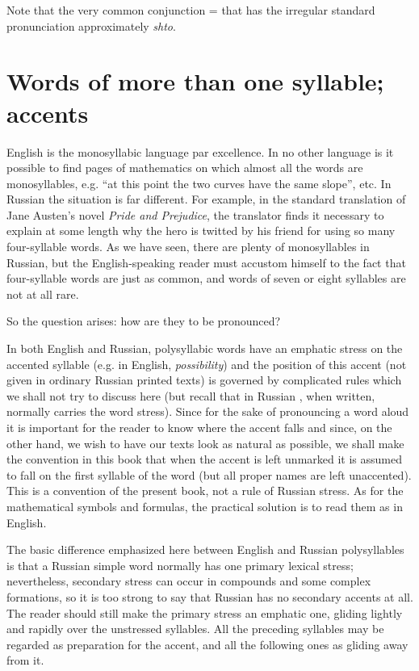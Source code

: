 Note that the very common conjunction  = that has the irregular standard pronunciation approximately \emph{shto}.

\section{Words of more than one syllable; accents}

English is the monosyllabic language par excellence. In no other language is it possible to find pages of mathematics on which almost all the words are monosyllables, e.g. ``at this point the two curves have the same slope'', etc. In Russian the situation is far different. For example, in the standard translation of Jane Austen's novel \emph{Pride and Prejudice}, the translator finds it necessary to explain at some length why the hero is twitted by his friend for using so many four-syllable words. As we have seen, there are plenty of monosyllables in Russian, but the English-speaking reader must accustom himself to the fact that four-syllable words are just as common, and words of seven or eight syllables are not at all rare.

So the question arises: how are they to be pronounced?

In both English and Russian, polysyllabic words have an emphatic stress on the accented syllable (e.g. in English, \emph{possibility}) and the position of this accent (not given in ordinary Russian printed texts) is governed by complicated rules which we shall not try to discuss here (but recall that in Russian , when written, normally carries the word stress). Since for the sake of pronouncing a word aloud it is important for the reader to know where the accent falls and since, on the other hand, we wish to have our texts look as natural as possible, we shall make the convention in this book that when the accent is left unmarked it is assumed to fall on the first syllable of the word (but all proper names are left unaccented). This is a convention of the present book, not a rule of Russian stress. As for the mathematical symbols and formulas, the practical solution is to read them as in English.

The basic difference emphasized here between English and Russian polysyllables is that a Russian simple word normally has one primary lexical stress; nevertheless, secondary stress can occur in compounds and some complex formations, so it is too strong to say that Russian has no secondary accents at all. The reader should still make the primary stress an emphatic one, gliding lightly and rapidly over the unstressed syllables. All the preceding syllables may be regarded as preparation for the accent, and all the following ones as gliding away from it.

